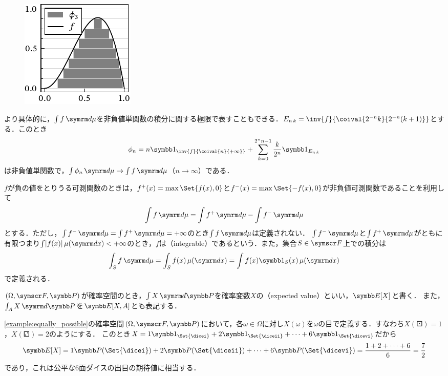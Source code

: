 \documentclass[../../main]{subfiles}
\begin{document}
\begin{figure}
  \includegraphics{figures/integration.pdf}
\end{figure}

より具体的に，\(\int f\measured{\mu}\)を非負値単関数の積分に関する極限で表すこともできる．\(\midx{E}{n}{k}=\inv{f}{\coival{2^{-n}k}{2^{-n}(k+1)}}\)とする．このとき
\[
  \phi_n = n\indicator_{\inv{f}{\coival{n}{+\infty}}}+\sum_{k=0}^{2^nn-1}\frac{k}{2^n}\indicator_{\midx{E}{n}{k}}
\]
は非負値単関数で，\(\int\phi_n\measured{\mu}\to\int f\measured{\mu}\)（\(n\to\infty\)）である．

\(f\)が負の値をとりうる可測関数のときは，\(f^{\mathord{+}}(x)=\max\Set{f(x),0}\)と\(f^{\mathord{-}}(x)=\max\Set{-f(x),0}\)が非負値可測関数であることを利用して
\[
  \int f\measured{\mu} = \int f^{\mathord{+}}\measured{\mu}-\int f^{\mathord{-}}\measured{\mu}
\]
とする．ただし，\(\int f^{\mathord{-}}\measured{\mu}=\int f^{\mathord{+}}\measured{\mu}=+\infty\)のとき\(\int f\measured{\mu}\)は定義されない．
\(\int f^{\mathord{-}}\measured{\mu}\)と\(\int f^{\mathord{+}}\measured{\mu}\)がともに有限\texttwoemdash つまり\(\int\abs{f(x)}\measured[x]{\mu}<+\infty\)\texttwoemdash のとき，\(f\)は（integrable）であるという．また，集合\(S\in\sigmaalg{F}\)上での積分は
\[
  \int_Sf\measured{\mu} = \int_Sf(x)\measured[x]{\mu}
  = \int f(x)\indicator_S(x)\measured[x]{\mu}
\]
で定義される．

\((\Omega,\sigmaalg{F},\prob)\)が確率空間のとき，\(\int X\measured{\prob}\)を確率変数\(X\)の（expected value）といい，\(\expval[X]\)と書く．
また，\(\int_AX\measured{\prob}\)を\(\expval[X,A]\)とも表記する．

\begin{example}
  \cref{example:equally_possible}の確率空間\((\Omega,\sigmaalg{F},\prob)\)において，各\(\omega\in\Omega\)に対し\(X(\omega)\)を\(\omega\)の目で定義する．すなわち\(X(\dicei)=1\)，\(X(\diceii)=2\)のようにする．
  このとき\(X=1\indicator_{\Set{\dicei}}+2\indicator_{\Set{\diceii}}+\dots+6\indicator_{\Set{\dicevi}}\)だから
  \[
    \expval[X] = 1\prob({\Set{\dicei}})+2\prob(\Set{\diceii})+\dots+6\prob({\Set{\dicevi}})
    = \frac{1+2+\dots+6}{6}
    = \frac{7}{2}
  \]
  であり，これは公平な6面ダイスの出目の期待値に相当する．
\end{example}
\end{document}
